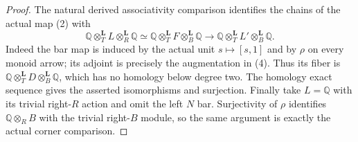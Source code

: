\begin{proof}
The natural derived associativity comparison identifies the chains of
the actual map (2) with
\[
 \mathbb Q\otimes_T^{\mathbf L}L\otimes_R^{\mathbf L}\mathbb Q
 \simeq
 \mathbb Q\otimes_T^{\mathbf L}F\otimes_B^{\mathbf L}\mathbb Q
 \longrightarrow
 \mathbb Q\otimes_T^{\mathbf L}L'\otimes_B^{\mathbf L}\mathbb Q.
                                                               \tag{8}
\]
Indeed the bar map is induced by the actual unit $s\mapsto[s,1]$
and by $\rho$ on every monoid arrow; its adjoint is precisely the
augmentation in (4).  Thus its fiber is
$\mathbb Q\otimes_T^{\mathbf L}D\otimes_B^{\mathbf L}\mathbb Q$,
which has no homology below degree two.  The homology exact sequence
gives the asserted isomorphisms and surjection.
Finally take $L=\mathbb Q$ with its trivial right-$R$ action and omit
the left $N$ bar.  Surjectivity of $\rho$ identifies
$\mathbb Q\otimes_R B$ with the trivial right-$B$ module, so the
same argument is exactly the actual corner comparison.
\end{proof}

